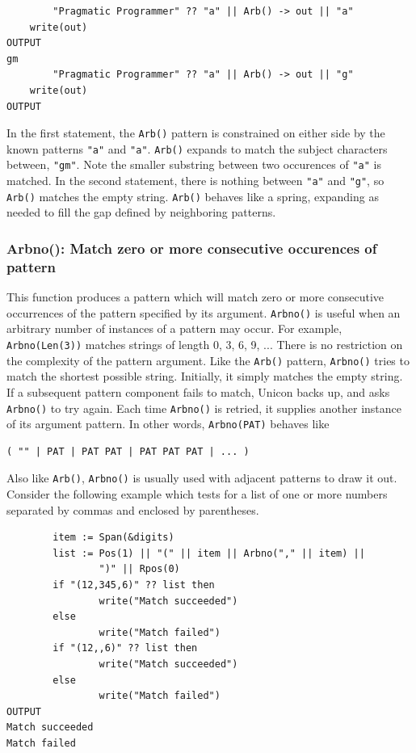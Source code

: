 \documentclass[letterpaper,12pt]{article}
\begin{document}
\begin{verbatim}
        "Pragmatic Programmer" ?? "a" || Arb() -> out || "a"
	write(out)
OUTPUT
gm
        "Pragmatic Programmer" ?? "a" || Arb() -> out || "g"
	write(out)
OUTPUT

\end{verbatim}

In the first statement, the {\tt Arb()} pattern is constrained on either
side by the known patterns {\tt "a"} and {\tt "a"}.
{\tt Arb()} expands to match the
subject characters between, {\tt "gm"}. Note the smaller substring between
two occurences of {\tt "a"} is matched. In the second statement, there is
nothing between {\tt "a"} and {\tt "g"}, so {\tt Arb()} matches the empty
string. {\tt Arb()} behaves like a spring, expanding as needed to fill the
gap defined by neighboring patterns.

\subsubsection{Arbno(): Match zero or more consecutive occurences of pattern}

This function produces a pattern which will match zero or more
consecutive occurrences of the pattern specified by its
argument. {\tt Arbno()} is useful when an arbitrary number of instances of
a pattern may occur. For example, {\tt Arbno(Len(3))} matches strings of
length 0, 3, 6, 9, ... There is no restriction on the complexity of
the pattern argument.  Like the {\tt Arb()} pattern, {\tt Arbno()} tries to
match the shortest possible string. Initially, it simply matches the
empty string. If a subsequent pattern component fails to match, Unicon
backs up, and asks {\tt Arbno()} to try again. Each time {\tt Arbno()} is
retried, it supplies another instance of its argument pattern.  In
other words, {\tt Arbno(PAT)} behaves like

\begin{verbatim}
( "" | PAT | PAT PAT | PAT PAT PAT | ... )
\end{verbatim}

Also like {\tt Arb()}, {\tt Arbno()} is usually used with adjacent patterns to
draw it out. Consider the following example which tests for a list of
one or more numbers separated by commas and enclosed by parentheses.

\begin{verbatim}
        item := Span(&digits)
        list := Pos(1) || "(" || item || Arbno("," || item) ||
                ")" || Rpos(0)
        if "(12,345,6)" ?? list then
                write("Match succeeded")
        else
                write("Match failed")
        if "(12,,6)" ?? list then
                write("Match succeeded")
        else
                write("Match failed")
OUTPUT
Match succeeded
Match failed
\end{verbatim}
\end{document}
